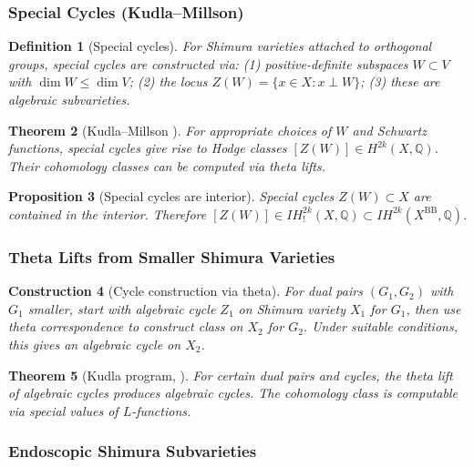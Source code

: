 \documentclass[12pt]{amsart}
\newtheorem{theorem}{Theorem}[section]
\newtheorem{proposition}[theorem]{Proposition}
\newtheorem{definition}[theorem]{Definition}
\newtheorem{construction}[theorem]{Construction}
\theoremstyle{definition}
\newcommand{\Q}{\mathbb{Q}}
\newcommand{\IH}{\mathit{IH}}
\begin{document}
\subsubsection{Special Cycles (Kudla--Millson)}

\begin{definition}[Special cycles]
For Shimura varieties attached to orthogonal groups, special cycles are constructed via: (1) positive-definite subspaces $W \subset V$ with $\dim W \le \dim V$; (2) the locus $Z(W) = \{ x \in X : x \perp W \}$; (3) these are algebraic subvarieties.
\end{definition}

\begin{theorem}[Kudla--Millson \cite{Kudla-Millson}]
For appropriate choices of $W$ and Schwartz functions, special cycles give rise to Hodge classes $[Z(W)] \in H^{2k}(X, \Q)$. Their cohomology classes can be computed via theta lifts.
\end{theorem}

\begin{proposition}[Special cycles are interior]
Special cycles $Z(W) \subset X$ are contained in the interior. Therefore $[Z(W)] \in \IH^{2k}_!(X, \Q) \subset \IH^{2k}(X^{\mathrm{BB}}, \Q)$.
\end{proposition}

\subsubsection{Theta Lifts from Smaller Shimura Varieties}

\begin{construction}[Cycle construction via theta]
For dual pairs $(G_1, G_2)$ with $G_1$ smaller, start with algebraic cycle $Z_1$ on Shimura variety $X_1$ for $G_1$, then use theta correspondence to construct class on $X_2$ for $G_2$. Under suitable conditions, this gives an algebraic cycle on $X_2$.
\end{construction}

\begin{theorem}[Kudla program, \cite{Kudla-derivatives}]
For certain dual pairs and cycles, the theta lift of algebraic cycles produces algebraic cycles. The cohomology class is computable via special values of $L$-functions.
\end{theorem}

\subsubsection{Endoscopic Shimura Subvarieties}
\end{document}
